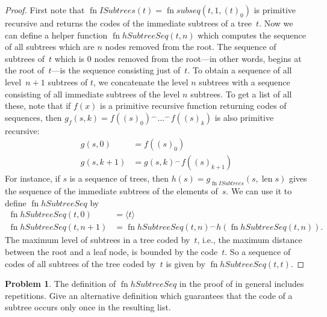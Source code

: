 \documentclass[10pt,a4paper]{article}
\makeatletter
\theoremstyle{plain}
\theoremstyle{definition}
\newtheorem{prob}{Problem}[section]
\theoremstyle{remark}
\newcommand{\olref}{\@ifnextchar[{\olref@i}{\olref@final}}
\def\olref@i[#1]{\@ifnextchar[{\olref@ii}{\olref@final}}
\def\olref@ii[#1]{\@ifnextchar[{\olref@iii}{\olref@final}}
\def\olref@iii[#1]{\olref@final}
\def\olref@final#1{\ref{#1}}
\providecommand{\tuple}[1]{\langle #1 \rangle}
\providecommand{\len}{\operatorname{len}}
\providecommand{\concat}{\mathbin{{}^\frown}}
\providecommand{\fn}{\operatorname{fn}}
\makeatother
\begin{document}
\begin{proof}
  First note that $\fn{ISubtrees}(t) = \fn{subseq}(t, 1, (t)_0)$ is
  primitive recursive and returns the codes of the immediate subtrees
  of a tree~$t$. Now we can define a helper function
  $\fn{hSubtreeSeq}(t,n)$ which computes the sequence of all subtrees
  which are $n$ nodes removed from the root. The sequence of subtrees
  of~$t$ which is $0$ nodes removed from the root---in other words,
  begins at the root of~$t$---is the sequence consisting just
  of~$t$. To obtain a sequence of all level~$n+1$ subtrees of $t$, we
  concatenate the level $n$ subtrees with a sequence consisting of all
  immediate subtrees of the level $n$ subtrees. To get a list of all
  these, note that if $f(x)$ is a primitive recursive function
  returning codes of sequences, then $g_f(s, k) = f((s)_0) \concat
  \dots \concat f((s)_k)$ is also primitive recursive:
    \begin{align*}
      g(s, 0) & = f((s)_0)\\
      g(s, k+1) & = g(s, k) \concat f((s)_{k+1})
    \end{align*}
    For instance, if $s$ is a sequence of trees, then
    $h(s) = g_{\fn{ISubtrees}}(s, \len{s})$ gives the sequence of the
    immediate subtrees of the elements of~$s$. We can use it to define
    $\fn{hSubtreeSeq}$ by
    \begin{align*}
      \fn{hSubtreeSeq}(t, 0) & = \tuple{t} \\
      \fn{hSubtreeSeq}(t, n+1) & = \fn{hSubtreeSeq}(t, n) \concat
      h(\fn{hSubtreeSeq}(t, n)).
    \end{align*}
    The maximum level of subtrees in a tree coded by~$t$, i.e., the
    maximum distance between the root and a leaf node, is bounded by
    the code~$t$. So a sequence of codes of all subtrees of the tree
    coded by~$t$ is given by $\fn{hSubtreeSeq}(t, t)$.
\end{proof}

\begin{prob}
  The definition of $\fn{hSubtreeSeq}$ in the proof of
  \olref[cmp][rec][tre]{prop:subtreeseq} in general includes
  repetitions. Give an alternative definition which guarantees that
  the code of a subtree occurs only once in the resulting list.
\end{prob}
\end{document}
